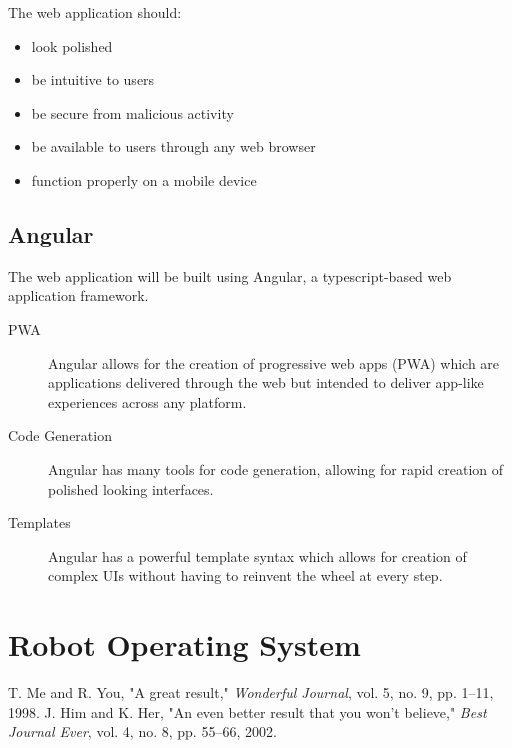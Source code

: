 \documentclass[12pt]{report}
\begin{document}
The web application should:
\begin{itemize}
\itemsep0em 
\item look polished
\item be intuitive to users
\item be secure from malicious activity
\item be available to users through any web browser
\item function properly on a mobile device
\end{itemize}
\subsection{Angular}
The web application will be built using Angular, a typescript-based web application framework. 
\begin{description}
   \item[PWA] Angular allows for the creation of progressive web apps (PWA) which are applications delivered through the web but intended to deliver app-like experiences across any platform.
   \item[Code Generation] Angular has many tools for code generation, allowing for rapid creation of polished looking interfaces.
   \item[Templates] Angular has a powerful template syntax which allows for creation of complex UIs without having to reinvent the wheel at every step.
\end{description}


\section{Robot Operating System}



\renewcommand{\bibname}{References}
\begin{thebibliography}{AAA}
 T. Me and R. You, "A great result," {\em Wonderful Journal}, vol. 5, no. 9,
	      pp. 1--11, 1998.
 J. Him and K. Her, "An even better result that you won't believe," {\em Best Journal Ever}, vol. 4, no. 8, pp. 55--66, 2002.
\end{thebibliography}
%    
%    
    \addcontentsline{toc}{chapter}{\bibname}
    

\appendix
\end{document}
